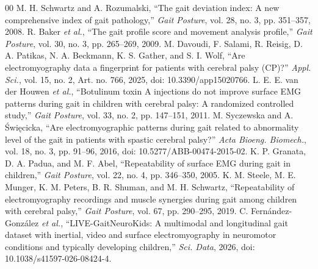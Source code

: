 \documentclass[conference]{IEEEtran}
\begin{document}
\begin{thebibliography}{00}
 M. H. Schwartz and A. Rozumalski, ``The gait deviation index: A new comprehensive index of gait pathology,'' \emph{Gait Posture}, vol. 28, no. 3, pp. 351--357, 2008.
 R. Baker \emph{et al.}, ``The gait profile score and movement analysis profile,'' \emph{Gait Posture}, vol. 30, no. 3, pp. 265--269, 2009.
 M. Davoudi, F. Salami, R. Reisig, D. A. Patikas, N. A. Beckmann, K. S. Gather, and S. I. Wolf, ``Are electromyography data a fingerprint for patients with cerebral palsy (CP)?'' \emph{Appl. Sci.}, vol. 15, no. 2, Art. no. 766, 2025, doi: 10.3390/app15020766.
 L. E. E. van der Houwen \emph{et al.}, ``Botulinum toxin A injections do not improve surface EMG patterns during gait in children with cerebral palsy: A randomized controlled study,'' \emph{Gait Posture}, vol. 33, no. 2, pp. 147--151, 2011.
 M. Syczewska and A. \'{S}wi\k{e}cicka, ``Are electromyographic patterns during gait related to abnormality level of the gait in patients with spastic cerebral palsy?'' \emph{Acta Bioeng. Biomech.}, vol. 18, no. 3, pp. 91--96, 2016, doi: 10.5277/ABB-00474-2015-02.
 K. P. Granata, D. A. Padua, and M. F. Abel, ``Repeatability of surface EMG during gait in children,'' \emph{Gait Posture}, vol. 22, no. 4, pp. 346--350, 2005.
 K. M. Steele, M. E. Munger, K. M. Peters, B. R. Shuman, and M. H. Schwartz, ``Repeatability of electromyography recordings and muscle synergies during gait among children with cerebral palsy,'' \emph{Gait Posture}, vol. 67, pp. 290--295, 2019.
 C. Fern\'{a}ndez-Gonz\'{a}lez \emph{et al.}, ``LIVE-GaitNeuroKids: A multimodal and longitudinal gait dataset with inertial, video and surface electromyography in neuromotor conditions and typically developing children,'' \emph{Sci. Data}, 2026, doi: 10.1038/s41597-026-08424-4.


\end{thebibliography}
\end{document}
